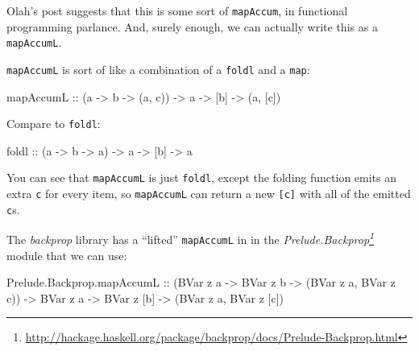 \documentclass[]{article}
\newenvironment{Shaded}{}{}
\newcommand{\DataTypeTok}[1]{\textcolor[rgb]{0.56,0.13,0.00}{#1}}
\newcommand{\FunctionTok}[1]{\textcolor[rgb]{0.02,0.16,0.49}{#1}}
\newcommand{\NormalTok}[1]{#1}
\newcommand{\OtherTok}[1]{\textcolor[rgb]{0.00,0.44,0.13}{#1}}
\renewcommand{\href}[2]{#2\footnote{\url{#1}}}
\begin{document}
Olah's post suggests that this is some sort of \texttt{mapAccum}, in functional
programming parlance. And, surely enough, we can actually write this as a
\texttt{mapAccumL}.

\texttt{mapAccumL} is sort of like a combination of a \texttt{foldl} and a
\texttt{map}:

\begin{Shaded}
\begin{Highlighting}[]
\NormalTok{mapAccumL}
\OtherTok{    ::}\NormalTok{ (a }\OtherTok{{-}\textgreater{}}\NormalTok{ b }\OtherTok{{-}\textgreater{}}\NormalTok{ (a, c))}
    \OtherTok{{-}\textgreater{}}\NormalTok{ a}
    \OtherTok{{-}\textgreater{}}\NormalTok{ [b]}
    \OtherTok{{-}\textgreater{}}\NormalTok{ (a, [c])}
\end{Highlighting}
\end{Shaded}

Compare to \texttt{foldl}:

\begin{Shaded}
\begin{Highlighting}[]
\FunctionTok{foldl}
\OtherTok{    ::}\NormalTok{ (a }\OtherTok{{-}\textgreater{}}\NormalTok{ b }\OtherTok{{-}\textgreater{}}\NormalTok{ a)}
    \OtherTok{{-}\textgreater{}}\NormalTok{ a}
    \OtherTok{{-}\textgreater{}}\NormalTok{ [b]}
    \OtherTok{{-}\textgreater{}}\NormalTok{ a}
\end{Highlighting}
\end{Shaded}

You can see that \texttt{mapAccumL} is just \texttt{foldl}, except the folding
function emits an extra \texttt{c} for every item, so \texttt{mapAccumL} can
return a new \texttt{{[}c{]}} with all of the emitted \texttt{c}s.

The \emph{backprop} library has a ``lifted'' \texttt{mapAccumL} in in the
\emph{\href{http://hackage.haskell.org/package/backprop/docs/Prelude-Backprop.html}{Prelude.Backprop}}
module that we can use:

\begin{Shaded}
\begin{Highlighting}[]
\NormalTok{Prelude.Backprop.mapAccumL}
\OtherTok{    ::}\NormalTok{ (}\DataTypeTok{BVar}\NormalTok{ z a }\OtherTok{{-}\textgreater{}} \DataTypeTok{BVar}\NormalTok{ z b }\OtherTok{{-}\textgreater{}}\NormalTok{ (}\DataTypeTok{BVar}\NormalTok{ z a, }\DataTypeTok{BVar}\NormalTok{ z c))}
    \OtherTok{{-}\textgreater{}} \DataTypeTok{BVar}\NormalTok{ z a}
    \OtherTok{{-}\textgreater{}} \DataTypeTok{BVar}\NormalTok{ z [b]}
    \OtherTok{{-}\textgreater{}}\NormalTok{ (}\DataTypeTok{BVar}\NormalTok{ z a, }\DataTypeTok{BVar}\NormalTok{ z [c])}
\end{Highlighting}
\end{Shaded}
\end{document}
